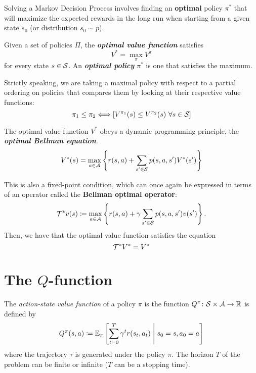 \documentclass[../course-notes.tex]{subfiles}
\begin{document}
Solving a Markov Decision Process involves finding an \textbf{\bluefont optimal} policy $\pi^*$ that will maximize the expected rewards in the long run when starting from a given state $s_0$ (or distribution $s_0 \sim p$).

\begin{defn}
	Given a set of policies $\Pi$, the \emph{\bfseries\bluefont optimal value function} satisfies
	\begin{equation}
	V^* = \max_{\pi} V^{\pi}
	\end{equation}
	for every state $s \in \mathcal{S}$. An \emph{\bfseries\bluefont optimal policy} $\pi^*$ is one that satisfies the maximum.
\end{defn}

Strictly speaking, we are taking a maximal policy with respect to a partial ordering on policies that compares them by looking at their respective value functions:
\[
	\pi_1 \leq \pi_2 \Longleftrightarrow
	\left[
	V^{\pi_1}(s) \leq V^{\pi_2}(s)\ \forall s\in\mathcal{S}
	\right]
\]


\begin{prop}
	The optimal value function $V^*$ obeys a dynamic programming principle, the \emph{\bfseries\bluefont optimal Bellman equation}.
	\begin{equation}\label{eq:ValueOptimalBellmanEq}
	V^*(s) = \max_{a\in\mathcal{A}}
	\left\{
	r(s,a) + \sum_{s'\in\mathcal{S}} p(s,a,s')V^*(s')
	\right\}
	\end{equation}
\end{prop}


This is also a fixed-point condition, which can once again be expressed in terms of an operator called the \textbf{Bellman optimal operator}:
\[
\mathcal{T}^*v(s) \coloneqq
\max_{a\in\mathcal{A}} \left\{
r(s,a) + \gamma\sum_{s'\in\mathcal{S}}p(s,a,s')v(s')
\right\}.
\]
Then, we have that the optimal value function satisfies the equation
\[
\mathcal{T}^* V^* = V^*
\]


\section{The $Q$-function}



\begin{defn}
	The \textit{action-state value function} of a policy $\pi$ is the function $Q^\pi\colon \mathcal{S}\times\mathcal{A}\to \mathbb{R}$ is defined by
	\begin{equation}
	Q^\pi(s, a) \coloneqq \operatorname{\mathbb{E}}_{\pi}
	\left[
	\sum_{t=0}^T \gamma^t r(s_t, a_t) \;\middle|\; s_0 = s, a_0 = a
	\right]
	\end{equation}
	where the trajectory $\tau$ is generated under the policy $\pi$.
	The horizon $T$ of the problem can be finite or infinite ($T$ can be a stopping time).
\end{defn}
\end{document}
